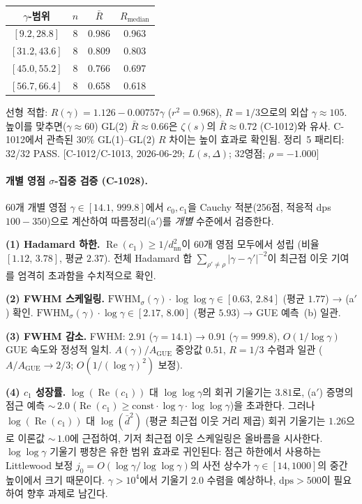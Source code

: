 \documentclass[11pt, a4paper]{article}
\theoremstyle{definition}
\theoremstyle{plain}
\begin{document}
\begin{center}
\small
\begin{tabular}{cccc}
\toprule
$\gamma$-범위 & $n$ & $\bar R$ & $R_{\mathrm{median}}$ \\
\midrule
$[9.2, 28.8]$  & 8 & 0.986 & 0.963 \\
$[31.2, 43.6]$ & 8 & 0.809 & 0.803 \\
$[45.0, 55.2]$ & 8 & 0.766 & 0.697 \\
$[56.7, 66.4]$ & 8 & 0.658 & 0.618 \\
\bottomrule
\end{tabular}
\end{center}

선형 적합: $R(\gamma) = 1.126 - 0.00757\gamma$ ($r^2 = 0.968$), $R = 1/3$으로의 외삽 $\gamma \approx 105$.
높이를 맞추면($\gamma \approx 60$) GL(2) $\bar R \approx 0.66$은 $\zeta(s)$의 $\bar R \approx 0.72$ (C-1012)와 유사.
C-1012에서 관측된 $30\%$ GL(1)--GL(2) $R$ 차이는 높이 효과로 확인됨.
정리~5 패리티: 32/32 PASS.
[C-1012/C-1013, 2026-06-29; $L(s,\Delta)$; 32영점; $\rho = -1.000$]

\paragraph{개별 영점 $\sigma$-집중 검증 (C-1028).}
60개 개별 영점 $\gamma \in [14.1,\, 999.8]$에서
$c_0, c_1$을 Cauchy 적분(256점, 적응적 dps $100{-}350$)으로 계산하여
따름정리(a$'$)를 \emph{개별} 수준에서 검증한다.

\smallskip\noindent
\textbf{(1) Hadamard 하한.}\;
$\operatorname{Re}(c_1) \ge 1/d_{\mathrm{nn}}^2$이 60개 영점 모두에서 성립
(비율 $[1.12,\, 3.78]$, 평균 $2.37$).
전체 Hadamard 합 $\sum_{\rho'\neq\rho}|\gamma-\gamma'|^{-2}$이
최근접 이웃 기여를 엄격히 초과함을 수치적으로 확인.

\smallskip\noindent
\textbf{(2) FWHM 스케일링.}\;
$\mathrm{FWHM}_\sigma(\gamma)\cdot\log\log\gamma \in [0.63,\, 2.84]$ (평균 $1.77$)
→ (a$'$) 확인.
$\mathrm{FWHM}_\sigma(\gamma)\cdot\log\gamma \in [2.17,\, 8.00]$ (평균 $5.93$)
→ GUE 예측~(b) 일관.

\smallskip\noindent
\textbf{(3) FWHM 감소.}\;
FWHM: $2.91$ ($\gamma{=}14.1$) → $0.91$ ($\gamma{=}999.8$),
$O(1/\log\gamma)$ GUE 속도와 정성적 일치.
$A(\gamma)/A_{\mathrm{GUE}}$ 중앙값 $0.51$, $R = 1/3$ 수렴과 일관
($A/A_{\mathrm{GUE}} \to 2/3$; $O(1/(\log\gamma)^2)$ 보정).

\smallskip\noindent
\textbf{(4) $c_1$ 성장률.}\;
$\log(\operatorname{Re}(c_1))$ 대 $\log\log\gamma$의
회귀 기울기는 $3.81$로, (a$'$) 증명의 점근 예측 ${\sim}\,2.0$
($\operatorname{Re}(c_1) \ge \text{const}\cdot\log\gamma\cdot\log\log\gamma$)을
초과한다. 그러나 $\log(\operatorname{Re}(c_1))$ 대
$\log(\bar{d}^2)$ (평균 최근접 이웃 거리 제곱) 회귀 기울기는
$1.26$으로 이론값 ${\sim}\,1.0$에 근접하여, 기저 최근접 이웃
스케일링은 올바름을 시사한다.
$\log\log\gamma$ 기울기 팽창은 유한 범위 효과로 귀인된다:
점근 하한에서 사용하는 Littlewood 보정
$j_0 = O(\log\gamma/\log\log\gamma)$의 사전 상수가
$\gamma \in [14, 1000]$의 중간 높이에서 크기 때문이다.
$\gamma > 10^4$에서 기울기 $2.0$ 수렴을 예상하나, $\mathrm{dps} > 500$이 필요하여 향후 과제로 남긴다.
\end{document}
